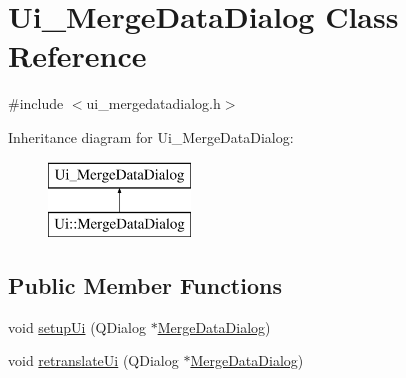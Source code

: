 \hypertarget{class_ui___merge_data_dialog}{}\section{Ui\+\_\+\+Merge\+Data\+Dialog Class Reference}
\label{class_ui___merge_data_dialog}


{\ttfamily \#include $<$ui\+\_\+mergedatadialog.\+h$>$}

Inheritance diagram for Ui\+\_\+\+Merge\+Data\+Dialog\+:\begin{figure}[H]
\begin{center}
\leavevmode
\includegraphics[height=2.000000cm]{de/dd6/class_ui___merge_data_dialog}
\end{center}
\end{figure}
\subsection*{Public Member Functions}
\begin{DoxyCompactItemize}
\item 
void \mbox{\hyperlink{class_ui___merge_data_dialog_ae2ee4a26cebe1ba0ae938ddef5b970d6}{setup\+Ui}} (Q\+Dialog $\ast$\mbox{\hyperlink{class_merge_data_dialog}{Merge\+Data\+Dialog}})
\item 
void \mbox{\hyperlink{class_ui___merge_data_dialog_aa488700be47cbedf2459bf0dbd8f2a73}{retranslate\+Ui}} (Q\+Dialog $\ast$\mbox{\hyperlink{class_merge_data_dialog}{Merge\+Data\+Dialog}})
\end{DoxyCompactItemize}

